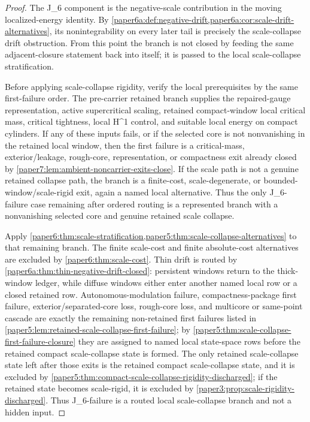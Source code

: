 \documentclass[11pt]{amsart}
\def\({}%
\def\){}%
\theoremstyle{plain}
\theoremstyle{definition}
\theoremstyle{remark}
\begin{document}
\begin{proof}
The \(J_6\) component is the negative-scale contribution in the moving
localized-energy identity.  By
\cref{paper6a:def:negative-drift,paper6a:cor:scale-drift-alternatives}, its
nonintegrability on every later tail is precisely the scale-collapse drift
obstruction.  From this point the branch is not closed by feeding the same
adjacent-closure statement back into itself; it is passed to the local
scale-collapse stratification.
\par
Before applying scale-collapse rigidity, verify the local prerequisites by the
same first-failure order.  The pre-carrier retained branch supplies the
repaired-gauge representation, active supercritical scaling, retained
compact-window local critical mass, critical tightness, local \(H^1\) control,
and suitable local energy on compact cylinders.  If any of these inputs fails,
or if the selected core is not nonvanishing in the retained local window, then
the first failure is a critical-mass, exterior/leakage, rough-core,
representation, or compactness exit already closed by
\cref{paper7:lem:ambient-noncarrier-exits-close}.  If the scale path is not a
genuine retained collapse path, the branch is a finite-cost, scale-degenerate,
or bounded-window/scale-rigid exit, again a named local alternative.  Thus the
only \(J_6\)-failure case remaining after ordered routing is a represented
branch with a nonvanishing selected core and genuine retained scale collapse.
\par
Apply
\cref{paper6:thm:scale-stratification,paper5:thm:scale-collapse-alternatives}
to that remaining branch.  The finite scale-cost and finite absolute-cost
alternatives are excluded by \cref{paper6:thm:scale-cost}.  Thin drift is
routed by \cref{paper6a:thm:thin-negative-drift-closed}: persistent windows
return to the thick-window ledger, while diffuse windows either enter another
named local row or a closed retained row.  Autonomous-modulation failure,
compactness-package first failure, exterior/separated-core loss, rough-core
loss, and multicore or same-point cascade are exactly the remaining
non-retained first failures listed in
\cref{paper5:lem:retained-scale-collapse-first-failure}; by
\cref{paper5:thm:scale-collapse-first-failure-closure} they are assigned to
named local state-space rows before the retained compact scale-collapse state
is formed.  The only retained scale-collapse state left after those exits is the
retained compact scale-collapse state, and it is excluded by
\cref{paper5:thm:compact-scale-collapse-rigidity-discharged}; if the retained
state becomes scale-rigid, it is excluded by
\cref{paper3:prop:scale-rigidity-discharged}.  Thus \(J_6\)-failure is a
routed local scale-collapse branch and not a hidden input.
\end{proof}
\end{document}
